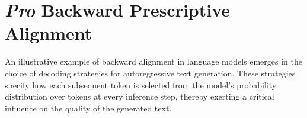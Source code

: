 \documentclass{article}
\theoremstyle{plain}
\theoremstyle{definition}
\theoremstyle{remark}
\begin{document}













\section{\textit{Pro} Backward Prescriptive Alignment}\label{sec:decoding}


An illustrative example of backward alignment in language models emerges in the choice of decoding strategies for autoregressive text generation. These strategies specify how each subsequent token is selected from the model’s probability distribution over tokens at every inference step, thereby exerting a critical influence on the quality of the generated text.
\end{document}

